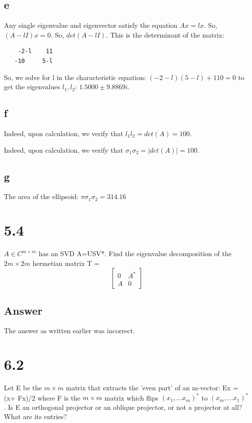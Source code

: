 \documentclass[10pt]{amsart}
\theoremstyle{remark}
\begin{document}
\subsection{e}
Any single eigenvalue and eigenvector satisfy the equation $Ax=lx$. So, $(A-lI)x=0$. So, $det(A-lI)$.
This is the determinant of the matrix:
\begin{verbatim}
    -2-l    11
   -10     5-l
\end{verbatim}

So, we solve for l in the characteristic equation: $(-2-l)(5-l) + 110 = 0$ to get the eigenvalues $l_{1}, l_{2}$: $1.5000 \pm 9.8869i$.

\subsection{f}
Indeed, upon calculation, we verify that $l_{1} l_{2} = det(A) = 100$.

Indeed, upon calculation, we verify that $\sigma_{1} \sigma_{2} = |det(A)| = 100$.

\subsection{g}
The area of the ellipsoid: $\pi\sigma_{1} \sigma_{2} = 314.16$

\section{5.4}
$A \in C^{m\times m}$ has an SVD A=USV*. Find the eigenvalue decomposition of the $2m \times 2m$ hermetian matrix T = 
\[ \left[ \begin{array}{cc}
0 & A^{*} \\
A & 0 \end{array} \right]\] 

\subsection{Answer}
The answer as written earlier was incorrect.


\section{6.2}
Let E be the $m\times m$ matrix that extracts the 'even part' of an m-vector: Ex = (x+ Fx)/2 where F is the $m \times m$ matrix which flips $(x_{1}, \dots x_{m})^{*}$ to $(x_{m}, \dots x_{1})^{*}$. Is E an orthogonal projector or an oblique projector, or not a projector at all? What are its entries?
\end{document}
